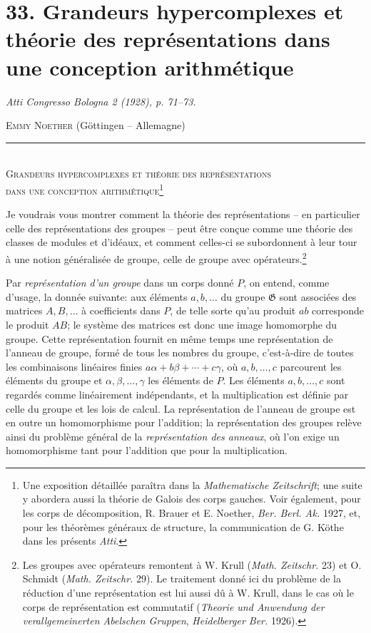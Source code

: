 
\section*{33. Grandeurs hypercomplexes et théorie des représentations dans une conception arithmétique}
\emph{Atti Congresso Bologna 2 (1928), p. 71--73.}

\setcounter{footnote}{0}
\begingroup
\renewcommand{\thefootnote}{(\arabic{footnote})}

\begin{center}
\textsc{Emmy Noether} (Göttingen -- Allemagne)\\[-0.1em]
\rule{3em}{0.4pt}\\[0.8em]
\textsc{Grandeurs hypercomplexes et théorie des représentations}\\
\textsc{dans une conception arithmétique}\footnote{Une exposition détaillée paraîtra dans la \emph{Mathematische Zeitschrift}; une suite y abordera aussi la théorie de Galois des corps gauches. Voir également, pour les \og{}corps de décomposition\fg{}, R. Brauer et E. Noether, \emph{Ber. Berl. Ak.} 1927, et, pour les théorèmes généraux de structure, la communication de G. Köthe dans les présents \emph{Atti}.}
\end{center}

Je voudrais vous montrer comment la théorie des représentations -- en particulier celle des représentations des groupes -- peut être conçue comme une théorie des classes de modules et d'idéaux, et comment celles-ci se subordonnent à leur tour à une notion généralisée de groupe, celle de groupe avec opérateurs.\footnote{Les groupes avec opérateurs remontent à W. Krull (\emph{Math. Zeitschr.} 23) et O. Schmidt (\emph{Math. Zeitschr.} 29). Le traitement donné ici du problème de la réduction d'une représentation est lui aussi dû à W. Krull, dans le cas où le corps de représentation est commutatif (\emph{Theorie und Anwendung der verallgemeinerten Abelschen Gruppen}, \emph{Heidelberger Ber.} 1926).}

Par \emph{représentation d'un groupe} dans un corps donné $P$, on entend, comme d'usage, la donnée suivante: aux éléments $a,b,\ldots$ du groupe $\mathfrak G$ sont associées des matrices $A,B,\ldots$ à coefficients dans $P$, de telle sorte qu'au produit $ab$ corresponde le produit $AB$; le système des matrices est donc une image homomorphe du groupe. Cette représentation fournit en même temps une représentation de l'\og{}anneau de groupe\fg{}, formé de tous les \og{}nombres du groupe\fg{}, c'est-à-dire de toutes les combinaisons linéaires finies $a\alpha+b\beta+\cdots+c\gamma$, où $a,b,\ldots,c$ parcourent les éléments du groupe et $\alpha,\beta,\ldots,\gamma$ les éléments de $P$. Les éléments $a,b,\ldots,c$ sont regardés comme linéairement indépendants, et la multiplication est définie par celle du groupe et les lois de calcul. La représentation de l'anneau de groupe est en outre un homomorphisme pour l'addition; la représentation des groupes relève ainsi du problème général de la \emph{représentation des anneaux}, où l'on exige un homomorphisme tant pour l'addition que pour la multiplication.


